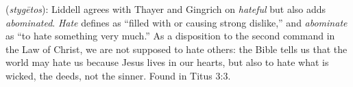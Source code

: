 \item[Hateful,]

(\textit{stygētos}):
Liddell agrees with Thayer and Gingrich on \emph{hateful} but also adds \emph{abominated}. \emph{Hate} defines as ``filled with or causing strong dislike,'' and \emph{abominate} as ``to hate something very much.'' As a disposition to the second command in the Law of Christ, we are not supposed to hate others: the Bible tells us that the world may hate us because Jesus lives in our hearts, but also to hate what is wicked, the deeds, not the sinner.
Found in Titus 3:3.
